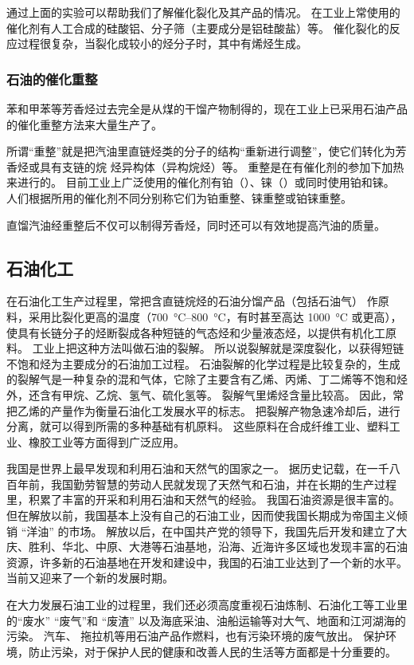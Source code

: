 通过上面的实验可以帮助我们了解催化裂化及其产品的情况。
在工业上常使用的催化剂有人工合成的硅酸铝、分子筛（主要成分是铝硅酸盐）等。
催化裂化的反应过程很复杂，当裂化成较小的烃分子时，其中有烯烃生成。

\subsubsection{石油的催化重整}
苯和甲苯等芳香烃过去完全是从煤的干馏产物制得的，现在工业上已采用石油产品的催化重整方法来大量生产了。

所谓“重整”就是把汽油里直链烃类的分子的结构“重新进行调整”，使它们转化为芳香烃或具有支链的烷 烃异构体（异构烷烃）等。
重整是在有催化剂的参加下加热来进行的。
目前工业上广泛使用的催化剂有铂（）、铼（）或同时使用铂和铼。
人们根据所用的催化剂不同分别称它们为铂重整、铼重整或铂铼重整。

直馏汽油经重整后不仅可以制得芳香烃，同时还可以有效地提高汽油的质量。

\subsection{石油化工}
在石油化工生产过程里，常把含直链烷烃的石油分馏产品（包括石油气） 作原料，采用比裂化更高的温度（\qtyrange{700}{800}{\celsius}，有时甚至高达 \qty{1000}{\celsius} 或更高），使具有长链分子的烃断裂成各种短链的气态烃和少量液态烃，以提供有机化工原料。
工业上把这种方法叫做石油的裂解。
所以说裂解就是深度裂化，以获得短链不饱和烃为主要成分的石油加工过程。
石油裂解的化学过程是比较复杂的，生成的裂解气是一种复杂的混和气体，它除了主要含有乙烯、丙烯、丁二烯等不饱和烃外，还含有甲烷、乙烷、氢气、硫化氢等。
裂解气里烯烃含量比较高。
因此，常把乙烯的产量作为衡量石油化工发展水平的标志。
把裂解产物急速冷却后，进行分离，就可以得到所需的多种基础有机原料。
这些原料在合成纤维工业、塑料工业、橡胶工业等方面得到广泛应用。

我国是世界上最早发现和利用石油和天然气的国家之一。
据历史记载，在一千八百年前，我国勤劳智慧的劳动人民就发现了天然气和石油，并在长期的生产过程里，积累了丰富的开采和利用石油和天然气的经验。
我国石油资源是很丰富的。
但在解放以前，我国基本上没有自己的石油工业，因而使我国长期成为帝国主义倾销 “洋油” 的市场。
解放以后，在中国共产党的领导下，我国先后开发和建立了大庆、胜利、华北、中原、大港等石油基地，沿海、近海许多区域也发现丰富的石油资源，许多新的石油基地在开发和建设中，我国的石油工业达到了一个新的水平。
当前又迎来了一个新的发展时期。

在大力发展石油工业的过程里，我们还必须高度重视石油炼制、石油化工等工业里的“废水” “废气”和 “废渣” 以及海底采油、油船运输等对大气、地面和江河湖海的污染。
汽车、 拖拉机等用石油产品作燃料，也有污染环境的废气放出。
保护环境，防止污染，对于保护人民的健康和改善人民的生活等方面都是十分重要的。

